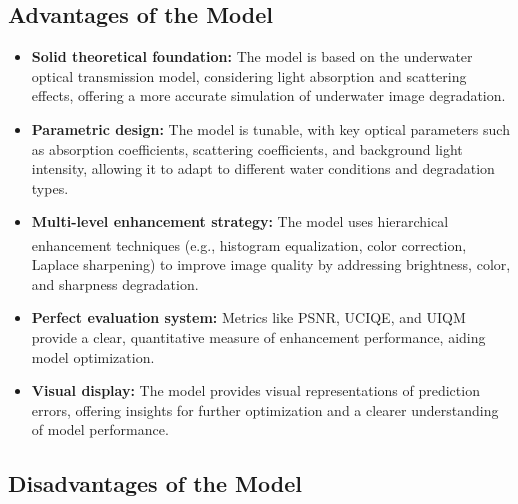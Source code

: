 \documentclass[withoutpreface,bwprint]{cumcmthesis}
\begin{document}
\subsection{Advantages of the Model}
\begin{itemize}[itemindent=2em]
\item \textbf{Solid theoretical foundation:} The model is based on the underwater optical transmission model, considering light absorption and scattering effects, offering a more accurate simulation of underwater image degradation.

\item \textbf{Parametric design:} The model is tunable, with key optical parameters such as absorption coefficients, scattering coefficients, and background light intensity, allowing it to adapt to different water conditions and degradation types.

\item \textbf{Multi-level enhancement strategy:} The model uses hierarchical enhancement techniques\textsuperscript{\cite{wang2008optimizing}} (e.g., histogram equalization, color correction, Laplace sharpening) to improve image quality by addressing brightness, color, and sharpness degradation.

\item \textbf{Perfect evaluation system:} Metrics like PSNR, UCIQE, and UIQM provide a clear, quantitative measure of enhancement performance, aiding model optimization.

\item \textbf{Visual display:} The model provides visual representations of prediction errors, offering insights for further optimization and a clearer understanding of model performance.

\end{itemize}

\subsection{ Disadvantages of the Model}
\end{document}

